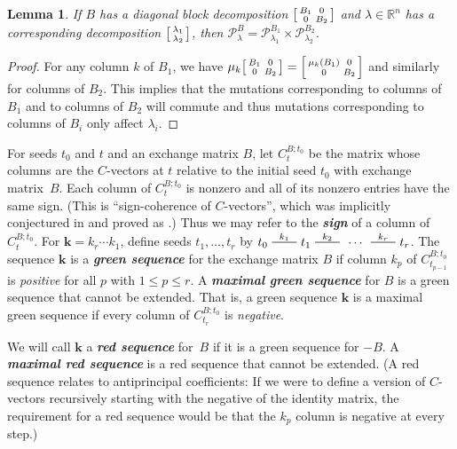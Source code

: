 \documentclass{amsart}
\newtheorem{lemma}[proposition]{Lemma}
\theoremstyle{definition}
\theoremstyle{remark}
\numberwithin{equation}{section}
\newcommand{\newword}[1]{\textbf{\emph{#1}}}
\newcommand{\reals}{\mathbb R}
\newcommand{\edge}{\,\,\rule[2.7pt]{20pt}{0.5pt}\,\,}
\newcommand{\0}{{\mathbf{0}}}
\newcommand{\kk}{{\boldsymbol{k}}}
\renewcommand{\P}{\mathcal{P}}
\begin{document}
\begin{lemma}\label{block dom}
If $B$ has a diagonal block decomposition $\begin{bsmallmatrix}B_1&0\\0&B_2\end{bsmallmatrix}$ and $\lambda\in\reals^n$ has a corresponding decomposition $\begin{bsmallmatrix}\lambda_1\\\lambda_2\end{bsmallmatrix}$, then $\P_\lambda^B=\P_{\lambda_1}^{B_1}\times\P_{\lambda_2}^{B_2}$.
\end{lemma}
\begin{proof}
  For any column $k$ of $B_1$, we have $\mu_k\begin{bsmallmatrix}B_1&0\\0&B_2\end{bsmallmatrix}=\begin{bsmallmatrix}\mu_k(B_1)&0\\0&B_2\end{bsmallmatrix}$ and similarly for columns of $B_2$.
  This implies that the mutations corresponding to columns of $B_1$ and to columns of $B_2$ will commute and thus mutations corresponding to columns of $B_i$ only affect $\lambda_i$.
\end{proof}

For seeds $t_0$ and $t$ and an exchange matrix $B$, let $C_t^{B;t_0}$ be the matrix whose columns are the $C$-vectors at $t$ relative to the initial seed $t_0$ with exchange matrix~$B$.
Each column of $C_t^{B;t_0}$ is nonzero and all of its nonzero entries have the same sign.
(This is ``sign-coherence of $C$-vectors'', which was implicitly conjectured in \cite{ca4} and proved as \cite[Corollary~5.5]{GHKK}.)
Thus we may refer to the \newword{sign} of a column of $C_t^{B;t_0}$.
For $\kk=k_r\cdots k_1$, define seeds $t_1,\ldots,t_r$ by $t_0\overset{k_1}{\edge}t_1\overset{k_2}{\edge}\,\cdots\,\overset{k_r}{\edge}t_r$.
The sequence $\kk$ is a \newword{green sequence} for the exchange matrix $B$ if column $k_p$ of $C_{t_{p-1}}^{B;t_0}$ is \emph{positive} for all $p$ with $1\le p\le r$.
A \newword{maximal green sequence} for $B$ is a green sequence that cannot be extended.
That is, a green sequence $\kk$ is a maximal green sequence if every column of $C_{t_r}^{B;t_0}$ is \emph{negative}.

We will call $\kk$ a \newword{red sequence} for~$B$ if it is a green sequence for $-B$.
A \newword{maximal red sequence} is a red sequence that cannot be extended.
(A red sequence relates to antiprincipal coefficients: 
If we were to define a version of $C$-vectors recursively starting with the negative of the identity matrix, the requirement for a red sequence would be that the $k_p$ column is negative at every step.)
\end{document}
